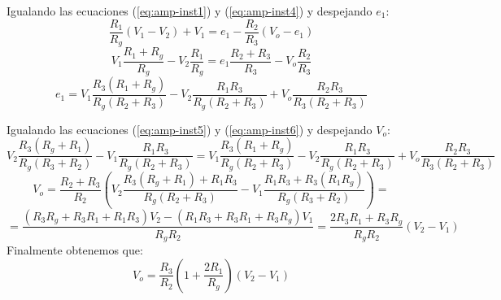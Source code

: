 Igualando las ecuaciones (\ref{eq:amp-inst1}) y (\ref{eq:amp-inst4}) y despejando $e_1$:
\[\frac{R_1}{R_g} (V_1 - V_2) + V_1 = e_1 - \frac{R_2}{R_3}(V_o - e_1)\]
\[V_1 \frac{R_1 + R_g}{R_g} - V_2 \frac{R_1}{R_g} = e_1 \frac{R_2 + R_3}{R_3} - V_o \frac{R_2}{R_3}\]
\begin{equation}
    e_1 = V_1 \frac{R_3 (R_1 + R_g)}{R_g (R_2 + R_3)} - V_2 \frac{R_1 R_3}{R_g (R_2 + R_3)} + V_o \frac{R_2 R_3}{R_3 (R_2 + R_3)}
    \label{eq:amp-inst6}
\end{equation}

Igualando las ecuaciones (\ref{eq:amp-inst5}) y (\ref{eq:amp-inst6}) y despejando $V_o$:
\[V_2 \frac{R_3 (R_g + R_1)}{R_g (R_3 + R_2)} - V_1 \frac{R_1 R_3}{R_g (R_2 + R_3)} = V_1 \frac{R_3 (R_1 + R_g)}{R_g (R_2 + R_3)} - V_2 \frac{R_1 R_3}{R_g (R_2 + R_3)} + V_o \frac{R_2 R_3}{R_3 (R_2 + R_3)} \]
\[V_o = \frac{R_2 + R_3}{R_2} \left( V_2 \frac{R_3 (R_g + R_1) + R_1 R_3}{R_g (R_2 + R_3)} - V_1 \frac{R_1 R_3 + R_3 (R_1 R_g)}{R_g (R_3 + R_2)}\right) = \]
\[ = \frac{(R_3 R_g + R_3 R_1 + R_1 R_3)V_2 - (R_1 R_3 + R_3 R_1 + R_3 R_g)V_1}{R_g R_2} = \frac{2R_3R_1 + R_3 R_g}{R_g R_2} (V_2 - V_1)\]
Finalmente obtenemos que:
\begin{equation}
    V_o = \frac{R_3}{R_2} \left( 1 + \frac{2R_1}{R_g} \right) (V_2 - V_1)
\end{equation}